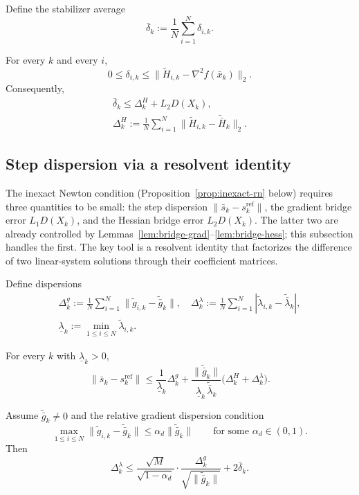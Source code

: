 \documentclass[review,onefignum,onetabnum]{siamart171218}
\begin{document}
	Define the stabilizer average
	\[
	\bar\delta_k:=\frac1N\sum_{i=1}^N \delta_{i,k}.
	\]
	
	\begin{lemma}\label{lem:delta_control}
		For every $k$ and every $i$,
		\[
		0\le \delta_{i,k}\le \big\|\tilde H_{i,k}-\nabla^2 f(\bar x_k)\big\|_2.
		\]
		Consequently,
		\begin{gather*}
			\bar\delta_k\le \Delta_k^H + L_2D(X_k),\\
			\Delta_k^H:=\tfrac1N\!\sum_{i=1}^N\big\|\tilde H_{i,k}-\tilde{\bar H}_k\big\|_2 .
		\end{gather*}
	\end{lemma}
	
	\subsection{Step dispersion via a resolvent identity}\label{ssec:stepdisp}
	The inexact Newton condition (Proposition~\ref{prop:inexact-rn} below)
	requires three quantities to be small: the step dispersion
	$\|\bar s_k - s_k^{\mathrm{ref}}\|$, the gradient bridge error
	$L_1 D(X_k)$, and the Hessian bridge error $L_2 D(X_k)$.
	The latter two are already controlled by
	Lemmas~\ref{lem:bridge-grad}--\ref{lem:bridge-hess};
	this subsection handles the first.
	The key tool is a resolvent identity that factorizes the
	difference of two linear-system solutions through their
	coefficient matrices.
	
	Define dispersions
	\begin{gather*}
		\Delta_k^g:=\tfrac1N\textstyle\sum_{i=1}^N \|\tilde g_{i,k}-\tilde{\bar g}_k\|,\quad
		\Delta_k^\lambda:=\tfrac1N\textstyle\sum_{i=1}^N |\tilde\lambda_{i,k}-\tilde{\bar\lambda}_k|,\\
		\underline\lambda_k:=\min_{1\le i\le N}\tilde\lambda_{i,k}.
	\end{gather*}
	
	\begin{lemma}\label{lem:step-disp}
		For every $k$ with $\underline\lambda_k>0$,
		\[
		\|\bar s_k-s_k^{\mathrm{ref}}\|
		\le \frac{1}{\underline\lambda_k}\Delta_k^g
		+\frac{\|\tilde{\bar g}_k\|}{\underline\lambda_k\,\tilde{\bar\lambda}_k}\big(\Delta_k^H+\Delta_k^\lambda\big).
		\]
	\end{lemma}
	
	\begin{lemma}\label{lem:lambda_dispersion}
		Assume $\tilde{\bar g}_k\neq 0$ and the relative gradient dispersion condition
		\begin{equation}\label{eq:rel_grad_disp}
			\max_{1\le i\le N}\|\tilde g_{i,k}-\tilde{\bar g}_k\|\le \alpha_d\|\tilde{\bar g}_k\|
			\qquad\text{for some }\alpha_d\in(0,1).
		\end{equation}
		Then
		\begin{equation}\label{eq:lambda_disp_bound}
			\Delta_k^\lambda
			\le
			\frac{\sqrt{M}}{\sqrt{1-\alpha_d}}\cdot\frac{\Delta_k^g}{\sqrt{\|\tilde{\bar g}_k\|}}
			+2\bar\delta_k.
		\end{equation}
	\end{lemma}
	
\end{document}

